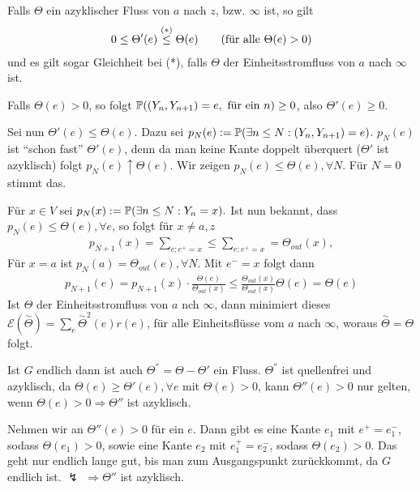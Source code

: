 \begin{satz}
	Falls $\Theta$ ein azyklischer Fluss von $a$ nach $z$, bzw. $\infty$ ist, so gilt
	\begin{align}
		0 \leq \Theta'(e) \overset{(*)}{\leq} \Theta(e) \text{\qquad(für alle $\Theta(e) > 0$)}
	\end{align}
	und es gilt sogar Gleichheit bei (*), falls $\Theta$ der Einheitsstromfluss von $a$ nach $\infty$ ist.
\end{satz}
\begin{beweis}
	Falls $\Theta(e) > 0$, so folgt $\propE{(Y_n,Y_{n+1}) = e, \text{ für ein $n$}} \geq 0$, also $\Theta'(e) \geq 0$. 
	
	Sei nun $\Theta'(e) \leq \Theta(e).$ Dazu sei $p_N(e):= \propE{\exists n \leq N: (Y_n, Y_{n+1})  = e}$. $p_N(e)$ ist \enquote{schon fast} $\Theta'(e)$, denn da man keine Kante doppelt überquert ($\Theta'$ ist azyklisch) folgt $p_N(e) \uparrow \Theta(e)$. Wir zeigen $p_N(e) \leq \Theta(e), \forall N$. Für $N = 0$ stimmt das. 
	
	Für $x \in V$ sei $p_N(x) := \propE{\exists n \leq N: Y_n = x}.$ Ist nun bekannt, dass $p_N(e) \leq \Theta(e), \forall e$, so folgt für $x \neq a,z$
	\begin{align}
		p_{N+1}(x) = \sum\limits_{e:e^+=x} \leq \sum\limits_{e:e^+=x} =  \Theta_{out}(x),
	\end{align}
	Für $x=a$ ist $p_N(a) = \Theta_{out}(e), \forall N$. Mit $e^-=x$ folgt dann 
	\begin{align}
		p_{N+1}(e) = p_{N+1}(x) \cdot \frac{\Theta(e)}{\Theta_{out}(x)} \leq \frac{\Theta_{out}(x)}{\Theta_{out}(x)}\Theta(e) = \Theta(e) 
	\end{align}
	Ist $\Theta$ der Einheitsstromfluss von $a$ nch $\infty$, dann minimiert dieses $\mathcal{E}(\overset{\sim}{\Theta}) = \sum\limits_{e} \overset{\sim}{\Theta}^2(e)r(e)$, für alle Einheitsflüsse vom $a$ nach $\infty$, woraus $\overset{\sim}{\Theta} = \Theta$ folgt.
	
	Ist $G$ endlich dann ist auch $\Theta^{''} = \Theta - \Theta'$ ein Fluss. $\Theta^{''}$ ist quellenfrei und azyklisch, da $\Theta(e) \geq \Theta'(e), \forall e$ mit $\Theta(e) > 0$, kann $\Theta''(e) > 0$ nur gelten, wenn $\Theta(e) > 0 \Rightarrow \Theta''$ ist azyklisch.
	
	Nehmen wir an $\Theta''(e) > 0$ für ein $e$. Dann gibt es eine Kante $e_1$ mit $e^+=e_1^-$, sodass $\Theta(e_1) > 0$, sowie eine Kante $e_2$ mit $e_1^+=e_2^-$, sodass $\Theta(e_2) > 0$. Das geht nur endlich lange gut, bis man zum Ausgangspunkt zurückkommt, da $G$ endlich ist. $\lightning$ $\Rightarrow \Theta''$ ist azyklisch.
\end{beweis}

